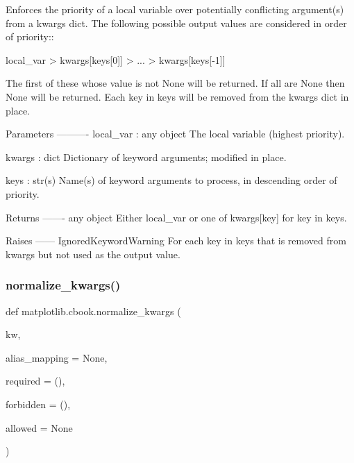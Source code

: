 \begin{DoxyVerb}Enforces the priority of a local variable over potentially conflicting
argument(s) from a kwargs dict. The following possible output values are
considered in order of priority::

    local_var > kwargs[keys[0]] > ... > kwargs[keys[-1]]

The first of these whose value is not None will be returned. If all are
None then None will be returned. Each key in keys will be removed from the
kwargs dict in place.

Parameters
----------
local_var : any object
    The local variable (highest priority).

kwargs : dict
    Dictionary of keyword arguments; modified in place.

keys : str(s)
    Name(s) of keyword arguments to process, in descending order of
    priority.

Returns
-------
any object
    Either local_var or one of kwargs[key] for key in keys.

Raises
------
IgnoredKeywordWarning
    For each key in keys that is removed from kwargs but not used as
    the output value.
\end{DoxyVerb}
 \mbox{\label{namespacematplotlib_1_1cbook_a144ca6cd74e33dfa5f931e3330047cad}} 
\subsubsection{\texorpdfstring{normalize\+\_\+kwargs()}{normalize\_kwargs()}}
{\footnotesize\ttfamily def matplotlib.\+cbook.\+normalize\+\_\+kwargs (\begin{DoxyParamCaption}\item[{}]{kw,  }\item[{}]{alias\+\_\+mapping = {\ttfamily None},  }\item[{}]{required = {\ttfamily ()},  }\item[{}]{forbidden = {\ttfamily ()},  }\item[{}]{allowed = {\ttfamily None} }\end{DoxyParamCaption})}

